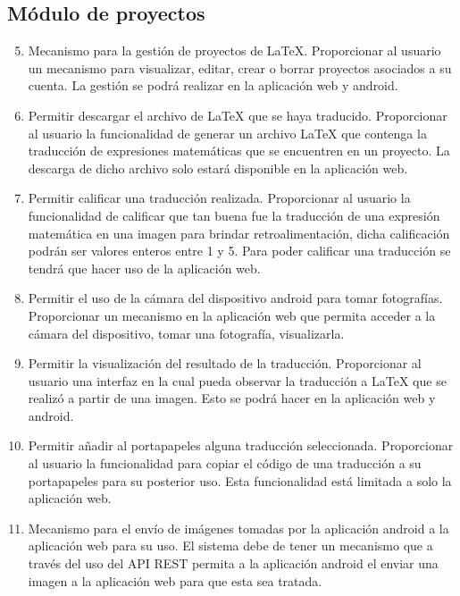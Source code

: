     \subsection{Módulo de proyectos}
    \begin{enumerate}[label=RF\arabic*.]
    	\setcounter{enumi}{4}
    	\item Mecanismo para la gestión de proyectos de \LaTeX{}. Proporcionar al usuario un mecanismo para visualizar, editar, crear o borrar proyectos asociados a su cuenta. La gestión se podrá realizar en la aplicación web y android.
    	\item Permitir descargar el archivo de \LaTeX{} que se haya traducido. Proporcionar al usuario la funcionalidad de generar un archivo \LaTeX{} que contenga la traducción de expresiones matemáticas que se encuentren en un proyecto. La descarga de dicho archivo solo estará disponible en la aplicación web.
    	\item Permitir calificar una traducción realizada. Proporcionar al usuario la funcionalidad de calificar que tan buena fue la traducción de una expresión matemática en una imagen para brindar retroalimentación, dicha calificación podrán ser valores enteros entre 1 y 5. Para poder calificar una traducción se tendrá que hacer uso de la aplicación web.
    	\item Permitir el uso de la cámara del dispositivo android para tomar fotografías. Proporcionar un mecanismo en la aplicación web que permita acceder a la cámara del dispositivo, tomar una fotografía, visualizarla.
    	\item Permitir la visualización del resultado de la traducción. Proporcionar al usuario una interfaz en la cual pueda observar la traducción a \LaTeX{} que se realizó a partir de una imagen. Esto se podrá hacer en la aplicación web y android.
    	\item Permitir añadir al portapapeles alguna traducción seleccionada. Proporcionar al usuario la funcionalidad para copiar el código de una traducción a su portapapeles para su posterior uso. Esta funcionalidad está limitada a solo la aplicación web.
    	\item Mecanismo para el envío de imágenes tomadas por la aplicación android a la aplicación web para su uso. El sistema debe de tener un mecanismo que a través del uso del API REST permita a la aplicación android el enviar una imagen a la aplicación web para que esta sea tratada. 
    \end{enumerate}
    
